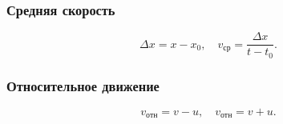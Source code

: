\documentclass[12 pt, a4paper]{article}
\begin{document}
\subsubsection*{Средняя скорость}
\[
\Delta x = x - x_0,
\quad
v_{\mathrm{ср}} = \frac{\Delta x}{t - t_0}.
\]

\subsubsection*{Относительное движение}
\[
v_{\mathrm{отн}} = v - u,
\quad
v_{\mathrm{отн}} = v + u.
\]
\end{document}
